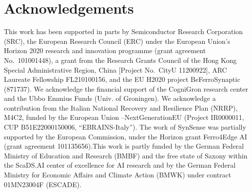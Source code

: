 \section*{Acknowledgements}



This work has been supported in parts by Semiconductor Research Corporation (SRC), the European Research Council (ERC) under the European Union’s Horizon 2020 research and innovation programme (grant agreement No.~101001448), a grant from the Research Grants Council of the Hong Kong Special Administrative Region, China [Project No.~CityU 11200922], ARC Laureate Fellowship FL210100156,  and the EU H2020 project BeFerroSynaptic (871737). We acknowledge the financial support of the CogniGron research center and the Ubbo Emmius Funds (Univ. of Groningen). We acknowledge a contribution from the Italian National Recovery and Resilience Plan (NRRP), M4C2, funded by the European Union –NextGenerationEU (Project IR0000011, CUP B51E22000150006, “EBRAINS-Italy”). The work of SynSense was partially supported by the European Commission, under the Horizon grant Ferro4Edge AI (grant agreement 101135656).This work is partly funded by the German Federal Ministry of Education and Research (BMBF) and the free state of Saxony within the ScaDS.AI center of excellence for AI research and by the German Federal Ministry for Economic Affairs and Climate Action (BMWK) under contract 01MN23004F (ESCADE).

